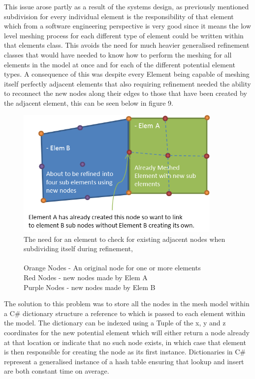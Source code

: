 \noindent
This issue arose partly as a result of the systems design, as previously mentioned subdivision for every individual element is the responsibility of that element which from a software engineering perspective is very good since it means the low level meshing process for each different type of element could be written within that elements class. This avoids the need for much heavier generalised refinement classes that would have needed to know how to perform the meshing for all elements in the model at once and for each of the different potential element types. A consequence of this was despite every Element being capable of meshing itself perfectly adjacent elements that also requiring refinement needed the ability to reconnect the new nodes along their edges to those that have been created by the adjacent element, this can be seen below in figure 9. \\ 


\begin{figure}[!h]
  \centerline{\includegraphics[width=100mm , scale=1]{../Graphics/nodeLinking.png}}
  \caption{The need for an element to check for existing adjacent nodes when subdividing itself during refinement,\\ \\
  	Orange Nodes - An original node for one or more elements \\
	Red Nodes - new nodes made by Elem A \\
	Purple Nodes - new nodes made by Elem B \\
  }
  \label{fig:h-refinementImp}
\end{figure}


\noindent
The solution to this problem was to store all the nodes in the mesh model within a C\# dictionary structure a reference to which is passed to each element within the model. The dictionary can be indexed using a Tuple of the x, y and z coordinates for the new potential element which will either return a node already at that location or indicate that no such node exists, in which case that element is then responsible for creating the node as its first instance. Dictionaries in C\# represent a generalised instance of a hash table ensuring that lookup and insert are both constant time on average.

